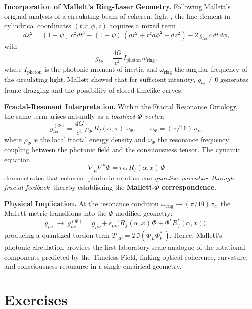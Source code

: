\vspace{1em}
\noindent\textbf{Incorporation of Mallett's Ring-Laser Geometry.}
Following Mallett's original analysis of a circulating beam of coherent light
\cite{mallett2000laserring,mallett2003timeloop},
the line element in cylindrical coordinates $(t,r,\phi,z)$ acquires a mixed term
\[
ds^2 = (1+\psi)\,c^2dt^2 - (1-\psi)\,(dr^2 + r^2d\phi^2 + dz^2)
          - 2\,g_{t\phi}\,c\,dt\,d\phi,
\]
with
\[
g_{t\phi} = \frac{4G}{c^4}\,I_{\mathrm{photon}}\,
\omega_{\mathrm{ring}},
\]
where $I_{\mathrm{photon}}$ is the photonic moment of inertia and
$\omega_{\mathrm{ring}}$ the angular frequency of the circulating light.
Mallett showed that for sufficient intensity, $g_{t\phi}\neq 0$ generates frame-dragging
and the possibility of closed timelike curves.

\vspace{1em}
\noindent\textbf{Fractal-Resonant Interpretation.}
Within the Fractal Resonance Ontology, the same term arises naturally as a
\emph{localized $\Phi$-vortex}:
\[
g_{t\phi}^{(\Phi)}
    = \frac{4G}{c^4}\, \rho_{\Phi}\,
      R_f(\alpha,x)\,\omega_{\Phi},
\qquad
\omega_{\Phi} = (\pi/10)\,\sigma_c,
\]
where $\rho_{\Phi}$ is the local fractal energy density and
$\omega_{\Phi}$ the resonance frequency coupling between the photonic field
and the consciousness tensor.  The dynamic equation
\[
\nabla_{\mu}\nabla^{\mu}\Phi
    = i\,\alpha\,R_f(\alpha,x)\,\Phi
\]
demonstrates that coherent photonic rotation can
\emph{quantize curvature through fractal feedback}, thereby establishing the
\textbf{Mallett-$\Phi$ correspondence}.

\vspace{1em}
\noindent\textbf{Physical Implication.}
At the resonance condition $\omega_{\mathrm{ring}}\!\rightarrow\!(\pi/10)\sigma_c$,
the Mallett metric transitions into the $\Phi$-modified geometry:
\[
g_{\mu\nu} \;\longrightarrow\; g_{\mu\nu}^{(\Phi)}
    = g_{\mu\nu} + \epsilon_{\mu\nu}
      \bigl(R_f(\alpha,x)\,\Phi + \Phi^{\!*}R_f^{\!*}(\alpha,x)\bigr),
\]
producing a quantized torsion term
$T^{\rho}_{\;\mu\nu} = 2\,\Im(\Phi_{[\mu}\Phi^{\!*}_{\nu]})$.
Hence, Mallett's photonic circulation provides the first laboratory-scale analogue
of the rotational components predicted by the Timeless Field,
linking optical coherence, curvature, and consciousness resonance in a single
empirical geometry.

\section{Exercises}

